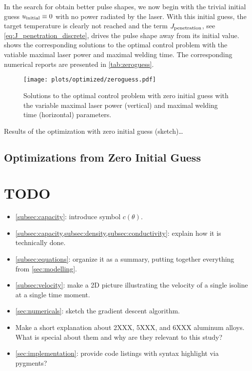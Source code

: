 In the search for obtain better pulse shapes, we now begin with the trivial initial guess $u_\textup{initial} \equiv 0$ with no power radiated by the laser. 
With this initial guess, the target temperature is clearly not reached and the term $J_\textup{penetration}$, see \eqref{eq:J_penetration_discrete}, drives the pulse shape away from its initial value.
 shows the corresponding solutions to the optimal control problem with the vatiable maximal laser power and maximal welding time. 
The corresponding numerical reports are presented in \cref{tab:zeroguess}.

\begin{figure} 
	\centering
	\texttt{[image: plots/optimized/zeroguess.pdf]}
	\caption{Solutions to the optimal control problem with zero initial guess with the variable maximal laser power (vertical) and maximal welding time (horizontal) parameters.}
	\label{fig:zeroguess}
\end{figure}

\begin{table} 
	\centering
	
	\caption{Results of the optimization with zero initial guess (sketch)\ldots}
	\label{tab:zeroguess}
\end{table}


\subsection{Optimizations from Zero Initial Guess}


\appendix

\section{TODO}
\begin{itemize}
	\item \cref{subsec:capacity}: introduce symbol $c(\theta)$.
	\item \cref{subsec:capacity,subsec:density,subsec:conductivity}: explain how it is technically done.
	\item \cref{subsec:equations}: organize it as a summary, putting together everything from \cref{sec:modelling}.
	\item \cref{subsec:velocity}: make a 2D picture illustrating the velocity of a single isoline at a single time moment.
	\item \cref{sec:numericals}: sketch the gradient descent algorithm.
	\item Make a short explanation about 2XXX, 5XXX, and 6XXX aluminum alloys. What is special about them and why are they relevant to this study?
	\item \cref{sec:implementation}: provide code listings with syntax highlight via pygments?
\end{itemize}

